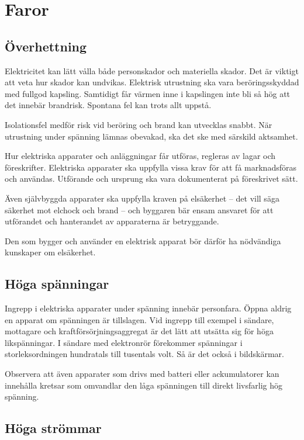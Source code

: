 \section{Faror}

\subsection{Överhettning}

Elektricitet kan lätt vålla både personskador och materiella skador.
Det är viktigt att veta hur skador kan undvikas.
Elektrisk utrustning ska vara beröringsskyddad med fullgod kapsling.
Samtidigt får värmen inne i kapslingen inte bli så hög att det innebär
brandrisk.
Spontana fel kan trots allt uppstå.

Isolationsfel medför risk vid beröring och brand kan utvecklas snabbt.
När utrustning under spänning lämnas obevakad, ska det ske med särskild
aktsamhet.

Hur elektriska apparater och anläggningar får utföras, regleras av
lagar och föreskrifter.
Elektriska apparater ska uppfylla vissa krav för att få marknadsföras och
användas.
Utförande och ursprung ska vara dokumenterat på föreskrivet sätt.

Även självbyggda apparater ska uppfylla kraven på elsäkerhet -- det vill säga
säkerhet mot elchock och brand -- och byggaren bär ensam ansvaret för att
utförandet och hanterandet av apparaterna är betryggande.

Den som bygger och använder en elektrisk apparat bör därför ha nödvändiga
kunskaper om elsäkerhet.

\subsection{Höga spänningar}

Ingrepp i elektriska apparater under spänning innebär personfara.
Öppna aldrig en apparat om spänningen är tillslagen.
Vid ingrepp till exempel i sändare, mottagare och kraftförsörjningsaggregat är
det lätt att utsätta sig för höga likspänningar.
I sändare med elektronrör förekommer spänningar i storleksordningen hundratals
till tusentals volt.
Så är det också i bildskärmar.

Observera att även apparater som drivs med batteri eller ackumulatorer kan
innehålla kretsar som omvandlar den låga spänningen till direkt livsfarlig hög
spänning.

\subsection{Höga strömmar}

